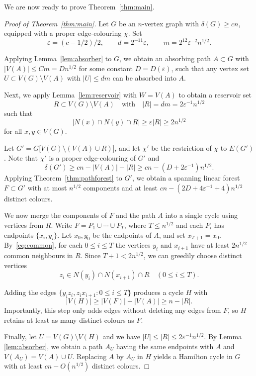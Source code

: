 \documentclass[11pt,reqno]{amsart}
\theoremstyle{definition}
\theoremstyle{remark}
\renewcommand\le{\leqslant}
\renewcommand\ge{\geqslant}
\begin{document}
We are now ready to prove Theorem~\ref{thm:main}.

\begin{proof}[Proof of Theorem~\ref{thm:main}]
Let $G$ be an $n$-vertex graph with $\delta(G)\ge cn$, equipped with a proper
edge-colouring $\chi$.
Set
\[
\varepsilon=(c-1/2)/2,\qquad
d=2^{-11}\varepsilon,\qquad
m=2^{12}\varepsilon^{-2}n^{1/2}.
\]

Applying Lemma~\ref{lem:absorber} to $G$, we obtain an absorbing path
$A\subset G$ with $|V(A)|\le Cm=Dn^{1/2}$
for some constant $D=D(\varepsilon)$, such that any vertex set
$U\subset V(G)\setminus V(A)$ with $|U|\le dm$ can be absorbed into $A$.

Next, we apply Lemma~\ref{lem:reservoir} with $W=V(A)$ to obtain a
reservoir set
\[
R\subset V(G)\setminus V(A)
\quad\text{with}\quad
|R|=dm=2\varepsilon^{-1}n^{1/2}
\]
such that
\begin{equation}\label{eq:common}
|N(x)\cap N(y)\cap R|\ge \varepsilon|R|\ge 2n^{1/2}
\end{equation}
for all $x,y\in V(G)$.

Let $G' = G\big[V(G)\setminus (V(A)\cup R)\big]$,
and let $\chi'$ be the restriction of $\chi$ to $E(G')$.
Note that $\chi'$ is a proper edge-colouring of $G'$ and 
$$\delta(G')\ge cn-|V(A)|-|R|
\ge cn-(D+2\varepsilon^{-1})n^{1/2}.$$ Applying Theorem~\ref{thm:pathforest} to $G'$, we obtain a spanning linear forest
$F\subset G'$ with at most $n^{1/2}$ components and at least $cn-(2D+4\varepsilon^{-1}+4)n^{1/2}$
distinct colours.

We now merge the components of $F$ and the path $A$ into a single cycle using
vertices from $R$.
Write $F=P_1\cup\cdots\cup P_T$, where $T\le n^{1/2}$ and each $P_i$ has endpoints
$\{x_i,y_i\}$.
Let $x_0,y_0$ be the endpoints of $A$, and set $x_{T+1}=x_0$.
By~\eqref{eq:common}, for each $0\le i\le T$ the vertices $y_i$ and $x_{i+1}$
have at least $2n^{1/2}$ common neighbours in $R$.
Since $T+1<2n^{1/2}$, we can greedily choose distinct vertices
\[
z_i\in N(y_i)\cap N(x_{i+1})\cap R
\quad (0\le i\le T).
\]

Adding the edges $\{y_iz_i,z_ix_{i+1}:0\le i\le T\}$ produces a cycle $H$ with
\[
|V(H)|\ge |V(F)|+|V(A)|\ge n-|R|.
\]
Importantly, this step only adds edges without deleting any edges from $F$, so $H$ retains at least as many distinct colours as $F$.


Finally, let $U=V(G)\setminus V(H)$ and we have $|U|\le |R|\le 2\varepsilon^{-1}n^{1/2}$.
By Lemma \ref{lem:absorber}, we obtain a path $A_U$ having the same endpoints with $A$ and
$V(A_U)=V(A)\cup U$.
Replacing $A$ by $A_U$ in $H$ yields a Hamilton cycle in $G$ with at least
$cn-O(n^{1/2})$ distinct colours.
\end{proof}
\end{document}
